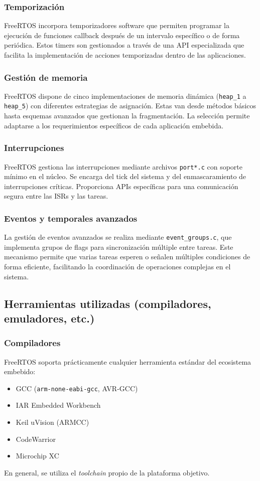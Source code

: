 \subsubsection*{Temporización}
FreeRTOS incorpora temporizadores software que permiten programar la ejecución de funciones callback después de un intervalo específico o de forma periódica. Estos timers son gestionados a través de una API especializada que facilita la implementación de acciones temporizadas dentro de las aplicaciones.\citep{freertos-book}

\subsubsection*{Gestión de memoria}
FreeRTOS dispone de cinco implementaciones de memoria dinámica (\texttt{heap\_1} a \texttt{heap\_5}) con diferentes estrategias de asignación. Estas van desde métodos básicos hasta esquemas avanzados que gestionan la fragmentación. La selección permite adaptarse a los requerimientos específicos de cada aplicación embebida.\citep{freertos-book}

\subsubsection*{Interrupciones}
FreeRTOS gestiona las interrupciones mediante archivos \texttt{port*.c} con soporte mínimo en el núcleo. Se encarga del tick del sistema y del enmascaramiento de interrupciones críticas. Proporciona APIs específicas para una comunicación segura entre las ISRs y las tareas.\citep{freertos-book}

\subsubsection*{Eventos y temporales avanzados}
La gestión de eventos avanzados se realiza mediante \texttt{event\_groups.c}, que implementa grupos de flags para sincronización múltiple entre tareas. Este mecanismo permite que varias tareas esperen o señalen múltiples condiciones de forma eficiente, facilitando la coordinación de operaciones complejas en el sistema.

\subsection{Herramientas utilizadas (compiladores, emuladores, etc.)}
\subsubsection*{Compiladores}
FreeRTOS soporta prácticamente cualquier herramienta estándar del ecosistema embebido:
\begin{itemize}
    \item GCC (\texttt{arm-none-eabi-gcc}, AVR-GCC)
    \item IAR Embedded Workbench
    \item Keil uVision (ARMCC)
    \item CodeWarrior
    \item Microchip XC
\end{itemize}
En general, se utiliza el \textit{toolchain} propio de la plataforma objetivo.

